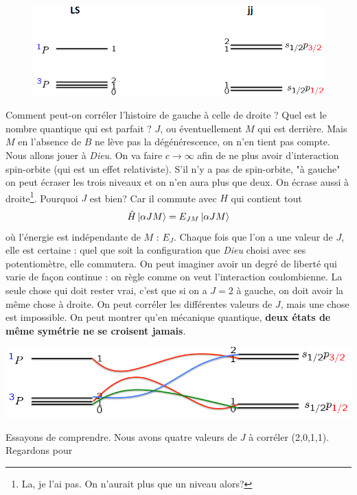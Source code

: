 	\begin{figure}
	\vspace{-5mm}
	\includegraphics[scale=0.4]{ch1/image6}
	\end{figure}
Comment peut-on corréler l'histoire de gauche à celle de droite ? Quel est le nombre quantique 
qui est parfait ? $J$, ou éventuellement $M$ qui est derrière. Mais $M$ en l'absence de $B$ 
ne lève pas la dégénérescence, on n'en tient pas compte. Nous allons jouer à \textit{Dieu}. On va
faire $c\to\infty$ afin de ne plus avoir d'interaction spin-orbite (qui est un effet relativiste).
S'il n'y a pas de spin-orbite, "à gauche" on peut écraser les trois niveaux et on n'en aura plus 
que deux. On écrase aussi à droite\footnote{La, je l'ai pas. On n'aurait plus que un niveau alors?}.
Pourquoi $J$ est bien? Car il commute avec $H$ qui contient tout
\begin{equation}
\hat H\ket{\alpha JM} = E_{JM}\ket{\alpha JM}
\end{equation}
où l'énergie est indépendante de $M$ : $E_J$. Chaque fois que l'on a une valeur de $J$, elle est
certaine : quel que soit la configuration que \textit{Dieu} choisi avec ses potentiomètre, elle commutera. On peut imaginer avoir un degré de liberté qui varie de façon continue : on règle
comme on veut l'interaction coulombienne. La seule chose qui doit rester vrai, c'est que si
on a $J=2$ à gauche, on doit avoir la même chose à droite. On peut corréler les différentes
valeurs de $J$, mais une chose est impossible. On peut montrer qu'en mécanique quantique, 
\textbf{deux états de même symétrie ne se croisent jamais}.
\begin{center}
	\includegraphics[scale=0.4]{ch1/image7}
\end{center}
Essayons de comprendre. Nous avons quatre valeurs de $J$ à corréler (2,0,1,1). Regardons pour

